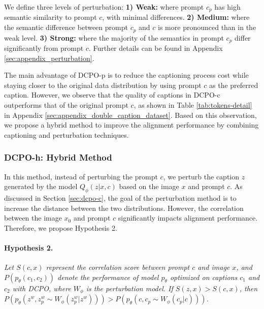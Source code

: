 We define three levels of perturbation: \textbf{1) Weak:} where prompt \( c_p \) has high semantic similarity to prompt \( c \), with minimal differences. \textbf{2) Medium:} where the semantic difference between prompt \( c_p \) and \( c \) is more pronounced than in the weak level. \textbf{3) Strong:} where the majority of the semantics in prompt \( c_p \) differ significantly from prompt \( c \). Further details can be found in Appendix \ref{sec:appendix_perturbation}.



The main advantage of DCPO-p is to reduce the captioning process cost while staying closer to the original data distribution by using prompt \( c \) as the preferred caption. However, we observe that the quality of captions in DCPO-c outperforms that of the original prompt \( c \), as shown in Table \ref{tab:tokens-detail} in Appendix \ref{sec:appendix_double_caption_dataset}. Based on this observation, we propose a hybrid method to improve the alignment performance by combining captioning and perturbation techniques.



\subsubsection{DCPO-h: Hybrid Method}
In this method, instead of perturbing the prompt \( c \), we perturb the caption \( z \) generated by the model \( Q_{\phi}(z|x, c) \) based on the image \( x \) and prompt \( c \). As discussed in Section \ref{sec:dcpo-c}, the goal of the perturbation method is to increase the distance between the two distributions. However, the correlation between the image \( x_0 \) and prompt \( c \) significantly impacts alignment performance. Therefore, we propose Hypothesis 2.

\paragraph{Hypothesis 2.} \textit{Let \( S(c, x) \) represent the correlation score between prompt \( c \) and image \( x \), and \( P(p_\theta(c_1, c_2)) \) denote the performance of model \( p_\theta \) optimized on captions \( c_1 \) and \( c_2 \) with DCPO, where \( W_{\phi} \) is the perturbation model. If \( S(z, x) > S(c, x) \), then \( P(p_\theta(z^w, z^w_p \sim W_{\phi}(z^w_p|z^w))) > P(p_\theta(c, c_p \sim W_{\phi}(c_p|c))) \).}


